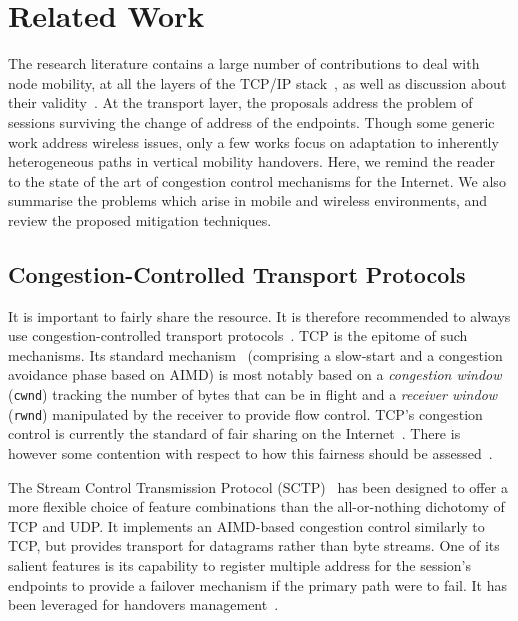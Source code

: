\documentclass[twocolumn]{nictatechreport}
\newcommand{\sysvar}[1]{\texttt{#1}}
\newcommand{\rwnd}{\sysvar{rwnd}}
\newcommand{\cwnd}{\sysvar{cwnd}}
\begin{document}
\section{Related Work}
\label{sec:related}

The research literature contains a large number of contributions to deal with
node mobility, at all the layers of the TCP/IP
stack~\cite{2007nazir_mobility-enabled_stack}, as well as discussion about their
validity~\cite{2004eddy_layer_mobility}. At the transport layer, the proposals
address the problem of sessions surviving the change of address of the
endpoints. Though some generic work address wireless issues, only a few works
focus on adaptation to inherently heterogeneous paths in vertical mobility
handovers.  Here, we remind the reader to the state of the art of
congestion control mechanisms for the Internet. We also summarise the problems
which arise in mobile and wireless environments, and review the proposed
mitigation techniques.

\subsection{Congestion-Controlled Transport Protocols}

It is important to fairly share the
resource. It is therefore recommended to always use congestion-controlled
transport protocols~\cite{1999floyd_end2end_congestion_control}. TCP is the
epitome of such mechanisms. Its standard mechanism~\cite{rfc5681,rfc3782}
(comprising a slow-start and a congestion avoidance phase based on AIMD) is most
notably based on a \emph{congestion window} (\cwnd) tracking the number of bytes
that can be in flight and a \emph{receiver window} (\rwnd) manipulated by the
receiver to provide flow control. TCP's congestion control is currently the
standard of fair sharing on the
Internet~\cite{1999floyd_end2end_congestion_control,rfc5166}.  There is however
some contention with respect to how this fairness should be
assessed~\cite{2007briscoe_fairness}.

The Stream Control Transmission Protocol (SCTP)~\cite{rfc4960} has been designed
to offer a more flexible choice of feature combinations than the all-or-nothing
dichotomy of TCP and UDP. It implements an AIMD-based congestion control
similarly to TCP, but provides transport for datagrams rather than byte streams.
One of its salient features is its capability to register multiple address for
the session's endpoints to provide a failover mechanism if the primary path were
to fail.  It has been leveraged for handovers
management~\cite{2008han_sctpfx,2009han_sctpmx}.
\end{document}
